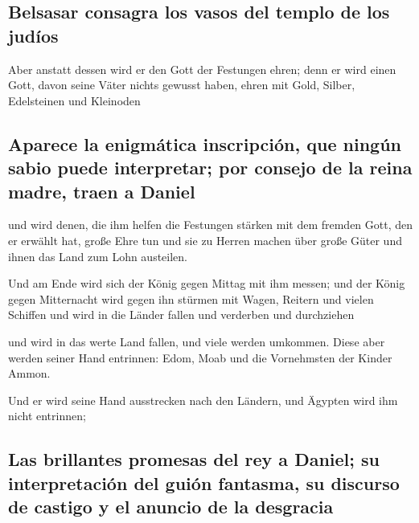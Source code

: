 \hypertarget{belsasar-consagra-los-vasos-del-templo-de-los-juduxedos}{%
\subsection{Belsasar consagra los vasos del templo de los
judíos}\label{belsasar-consagra-los-vasos-del-templo-de-los-juduxedos}}

 Aber anstatt dessen wird er den Gott der Festungen
ehren; denn er wird einen Gott, davon seine Väter nichts gewusst haben,
ehren mit Gold, Silber, Edelsteinen und Kleinoden

\hypertarget{aparece-la-enigmuxe1tica-inscripciuxf3n-que-ninguxfan-sabio-puede-interpretar-por-consejo-de-la-reina-madre-traen-a-daniel}{%
\subsection{Aparece la enigmática inscripción, que ningún sabio puede
interpretar; por consejo de la reina madre, traen a
Daniel}\label{aparece-la-enigmuxe1tica-inscripciuxf3n-que-ninguxfan-sabio-puede-interpretar-por-consejo-de-la-reina-madre-traen-a-daniel}}

 und wird denen, die ihm helfen die Festungen stärken mit
dem fremden Gott, den er erwählt hat, große Ehre tun und sie zu Herren
machen über große Güter und ihnen das Land zum Lohn austeilen.

 Und am Ende wird sich der König gegen Mittag mit ihm
messen; und der König gegen Mitternacht wird gegen ihn stürmen mit
Wagen, Reitern und vielen Schiffen und wird in die Länder fallen und
verderben und durchziehen

 und wird in das werte Land fallen, und viele werden
umkommen. Diese aber werden seiner Hand entrinnen: Edom, Moab und die
Vornehmsten der Kinder Ammon.

 Und er wird seine Hand ausstrecken nach den Ländern, und
Ägypten wird ihm nicht entrinnen;

\hypertarget{las-brillantes-promesas-del-rey-a-daniel-su-interpretaciuxf3n-del-guiuxf3n-fantasma-su-discurso-de-castigo-y-el-anuncio-de-la-desgracia}{%
\subsection{Las brillantes promesas del rey a Daniel; su interpretación
del guión fantasma, su discurso de castigo y el anuncio de la
desgracia}\label{las-brillantes-promesas-del-rey-a-daniel-su-interpretaciuxf3n-del-guiuxf3n-fantasma-su-discurso-de-castigo-y-el-anuncio-de-la-desgracia}}

